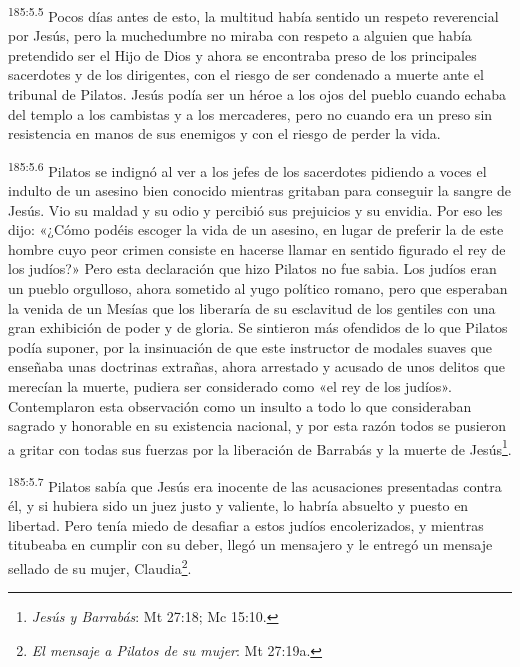 \par
\textsuperscript{185:5.5} Pocos días antes de esto, la multitud había sentido un respeto reverencial por Jesús, pero la muchedumbre no miraba con respeto a alguien que había pretendido ser el Hijo de Dios y ahora se encontraba preso de los principales sacerdotes y de los dirigentes, con el riesgo de ser condenado a muerte ante el tribunal de Pilatos. Jesús podía ser un héroe a los ojos del pueblo cuando echaba del templo a los cambistas y a los mercaderes, pero no cuando era un preso sin resistencia en manos de sus enemigos y con el riesgo de perder la vida.

\par
\textsuperscript{185:5.6} Pilatos se indignó al ver a los jefes de los sacerdotes pidiendo a voces el indulto de un asesino bien conocido mientras gritaban para conseguir la sangre de Jesús. Vio su maldad y su odio y percibió sus prejuicios y su envidia. Por eso les dijo: «¿Cómo podéis escoger la vida de un asesino, en lugar de preferir la de este hombre cuyo peor crimen consiste en hacerse llamar en sentido figurado el rey de los judíos?» Pero esta declaración que hizo Pilatos no fue sabia. Los judíos eran un pueblo orgulloso, ahora sometido al yugo político romano, pero que esperaban la venida de un Mesías que los liberaría de su esclavitud de los gentiles con una gran exhibición de poder y de gloria. Se sintieron más ofendidos de lo que Pilatos podía suponer, por la insinuación de que este instructor de modales suaves que enseñaba unas doctrinas extrañas, ahora arrestado y acusado de unos delitos que merecían la muerte, pudiera ser considerado como «el rey de los judíos». Contemplaron esta observación como un insulto a todo lo que consideraban sagrado y honorable en su existencia nacional, y por esta razón todos se pusieron a gritar con todas sus fuerzas por la liberación de Barrabás y la muerte de Jesús\footnote{\textit{Jesús y Barrabás}: Mt 27:18; Mc 15:10.}.

\par
\textsuperscript{185:5.7} Pilatos sabía que Jesús era inocente de las acusaciones presentadas contra él, y si hubiera sido un juez justo y valiente, lo habría absuelto y puesto en libertad. Pero tenía miedo de desafiar a estos judíos encolerizados, y mientras titubeaba en cumplir con su deber, llegó un mensajero y le entregó un mensaje sellado de su mujer, Claudia\footnote{\textit{El mensaje a Pilatos de su mujer}: Mt 27:19a.}.

